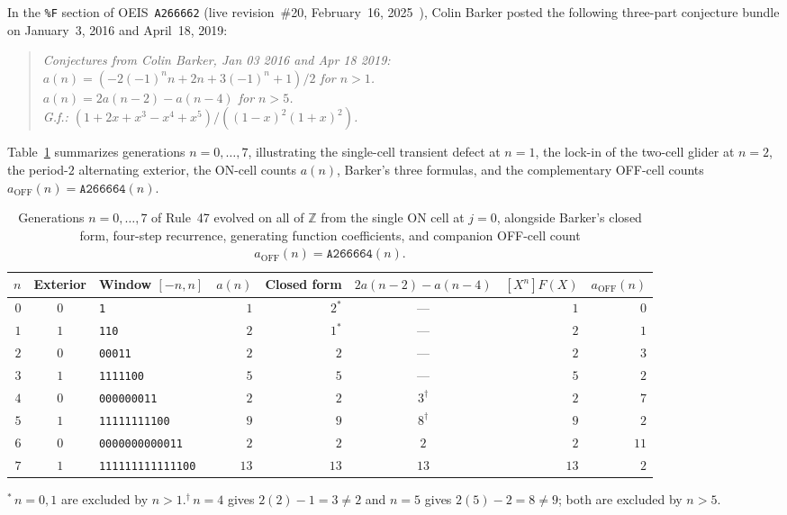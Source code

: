 \documentclass[11pt]{article}
\theoremstyle{definition}
\newcommand{\Z}{\mathbb{Z}}
\newcommand{\seq}[1]{\texttt{#1}}
\begin{document}
In the \texttt{\%F} section of OEIS~\seq{A266662} (live revision~\#20, February~16, 2025~\cite{oeis266662}), Colin Barker posted the following three-part conjecture bundle on January~3, 2016 and April~18, 2019:
\begin{quote}\itshape
Conjectures from Colin Barker, Jan 03 2016 and Apr 18 2019:\\
$a(n) = (-2(-1)^n n + 2n + 3(-1)^n + 1)/2$ for $n > 1$.\\
$a(n) = 2a(n - 2) - a(n - 4)$ for $n > 5$.\\
G.f.: $(1 + 2x + x^3 - x^4 + x^5) / ((1 - x)^2(1 + x)^2)$.
\end{quote}
Table~\ref{tab:small-n} summarizes generations $n = 0, \dots, 7$, illustrating the single-cell transient defect at $n = 1$, the lock-in of the two-cell glider at $n = 2$, the period-$2$ alternating exterior, the ON-cell counts $a(n)$, Barker's three formulas, and the complementary OFF-cell counts $a_{\mathrm{OFF}}(n) = \seq{A266664}(n)$.

\begin{table}[ht]
\centering
\caption{Generations $n = 0, \dots, 7$ of Rule~47 evolved on all of $\Z$ from the single ON cell at $j = 0$, alongside Barker's closed form, four-step recurrence, generating function coefficients, and companion OFF-cell count $a_{\mathrm{OFF}}(n) = \seq{A266664}(n)$.}
\label{tab:small-n}
\smallskip
{\small
\begin{tabular}{@{}r c l r r c r r@{}}
\toprule
$n$ & Exterior & Window $[-n, n]$ & $a(n)$ & Closed form & $2a(n-2) - a(n-4)$ & $[X^n]F(X)$ & $a_{\mathrm{OFF}}(n)$ \\
\midrule
$0$ & $0$ & \texttt{1} & $1$ & $2^*$ & --- & $1$ & $0$ \\
$1$ & $1$ & \texttt{110} & $2$ & $1^*$ & --- & $2$ & $1$ \\
$2$ & $0$ & \texttt{00011} & $2$ & $2$ & --- & $2$ & $3$ \\
$3$ & $1$ & \texttt{1111100} & $5$ & $5$ & --- & $5$ & $2$ \\
$4$ & $0$ & \texttt{000000011} & $2$ & $2$ & $3^\dagger$ & $2$ & $7$ \\
$5$ & $1$ & \texttt{11111111100} & $9$ & $9$ & $8^\dagger$ & $9$ & $2$ \\
$6$ & $0$ & \texttt{0000000000011} & $2$ & $2$ & $2$ & $2$ & $11$ \\
$7$ & $1$ & \texttt{111111111111100} & $13$ & $13$ & $13$ & $13$ & $2$ \\
\bottomrule
\end{tabular}

\smallskip
{\footnotesize ${}^*$\,$n = 0, 1$ are excluded by $n > 1$.\quad ${}^\dagger$\,$n = 4$ gives $2(2) - 1 = 3 \ne 2$ and $n = 5$ gives $2(5) - 2 = 8 \ne 9$; both are excluded by $n > 5$.}
}
\end{table}
\end{document}
